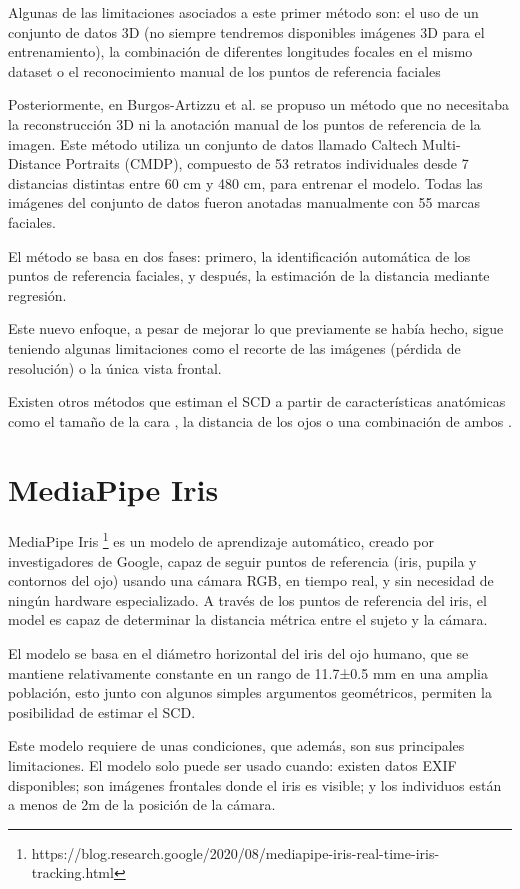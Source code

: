 Algunas de las limitaciones asociados a este primer método son: el uso de un conjunto de datos 3D (no siempre tendremos disponibles imágenes 3D para el entrenamiento), la combinación de diferentes longitudes focales en el mismo dataset o el reconocimiento manual de los puntos de referencia faciales

Posteriormente, en Burgos-Artizzu et al. \cite{30} se propuso un método que no necesitaba la reconstrucción 3D ni la anotación manual de los puntos de referencia de la imagen. Este método utiliza un conjunto de datos llamado Caltech Multi-Distance Portraits (CMDP), compuesto de 53 retratos individuales desde 7 distancias distintas entre 60 cm y 480 cm, para entrenar el modelo. Todas las imágenes del conjunto de datos fueron anotadas manualmente con 55 marcas faciales. 

El método se basa en dos fases: primero, la identificación automática de los puntos de referencia faciales, y después, la estimación de la distancia mediante regresión.

Este nuevo enfoque, a pesar de mejorar lo que previamente se había hecho, sigue teniendo algunas limitaciones como el recorte de las imágenes (pérdida de resolución) o la única vista frontal.

Existen otros métodos que estiman el SCD a partir de características anatómicas como el tamaño de la cara \cite{32}, la distancia de los ojos \cite{33} o una combinación de ambos \cite{34}.

\section{MediaPipe Iris}

MediaPipe Iris \footnote{https://blog.research.google/2020/08/mediapipe-iris-real-time-iris-tracking.html} es un modelo de aprendizaje automático, creado por investigadores de Google, capaz de seguir puntos de referencia (iris, pupila y contornos del ojo) usando una cámara RGB, en tiempo real, y sin necesidad de ningún hardware especializado. A través de los puntos de referencia del iris, el model es capaz de determinar la distancia métrica entre el sujeto y la cámara.

El modelo se basa en el diámetro horizontal del iris del ojo humano, que se mantiene relativamente constante en un rango de 11.7±0.5 mm en una amplia población, esto junto con algunos simples argumentos geométricos, permiten la posibilidad de estimar el SCD.

Este modelo requiere de unas condiciones, que además, son sus principales limitaciones. El modelo solo puede ser usado cuando: existen datos EXIF disponibles; son imágenes frontales donde el iris es visible; y los individuos están a menos de 2m de la posición de la cámara.



